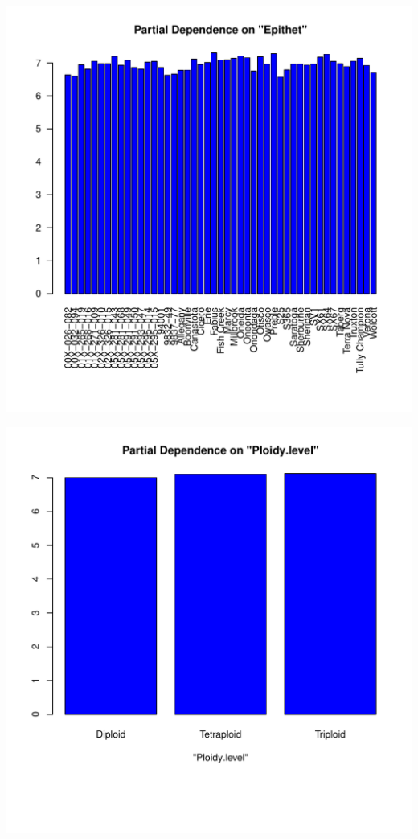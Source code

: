 \documentclass{article}\usepackage[]{graphicx}\usepackage[]{color}
\makeatletter
\def\maxwidth{ %
  \ifdim\Gin@nat@width>\linewidth
    \linewidth
  \else
    \Gin@nat@width
  \fi
}
\newenvironment{knitrout}{}{} %
\makeatother
\begin{document}
\begin{knitrout}
{}




{\centering \includegraphics[width=\maxwidth]{figure/PartialDependence-5} 

}




{\centering \includegraphics[width=\maxwidth]{figure/PartialDependence-6} 

}



\end{knitrout}
\\
\end{document}
